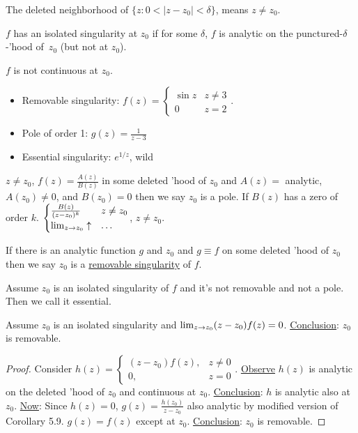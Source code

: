 \documentclass[]{article}
\begin{document}
\begin{definition}
	The deleted neighborhood of $\{z:0<|z-z_0|<\delta\}$, means $z\neq z_0$.
\end{definition}
\begin{definition}
	$f$ has an isolated singularity at $z_0$ if for some $\delta$, $f$ is analytic on the punctured-$\delta$-'hood of~$z_0$ (but not at $z_0$).
\end{definition}
\begin{observe}
	$f$ is not continuous at $z_0$.
\end{observe}
\begin{example}
	\begin{itemize}
		\item Removable singularity: $f(z) = \begin{cases} \sin{z} & z\neq 3 \\ 0 & z=2 \end{cases}$.
		\item Pole of order 1: $g(z) = \frac{1}{z-3}$
		\item Essential singularity: $e^{1/z}$, wild
	\end{itemize}
\end{example}
\begin{definition}
	$z\neq z_0$, $f(z) = \frac{A(z)}{B(z)}$ in some deleted 'hood of $z_0$ and $A(z) = $ analytic, $A(z_0) \neq 0$, and $B(z_0) = 0$ then we say $z_0$ is a pole. If $B(z)$ has a zero of order $k$. $\begin{cases} \frac{B(z)}{(z-z_0)^k} & z\neq z_0 \\ \lim_{z\rightarrow z_0} \uparrow & \dots \end{cases}$, $z\neq z_0$.
\end{definition}
\begin{definition}
	If there is an analytic function $g$ and $z_0$ and $g\equiv f$ on some deleted 'hood of $z_0$ then we say $z_0$ is a \underline{removable singularity} of $f$.
\end{definition}
\begin{definition}
	Assume $z_0$ is an isolated singularity of $f$ and it's not removable and not a pole. Then we call it essential.
\end{definition}
\begin{theorem}
	 Assume $z_0$ is an isolated singularity and $\lim_{z\rightarrow z_0} (z-z_0) f(z) = 0$. \underline{Conclusion}: $z_0$ is removable.
\end{theorem}
\begin{proof}
	Consider $h(z) = \begin{cases} (z-z_0)f(z), & z\neq 0 \\ 0, & z=0 \end{cases}$. \underline{Observe} $h(z)$ is analytic on the deleted 'hood of $z_0$ and continuous at $z_0$. \underline{Conclusion}: $h$ is analytic also at $z_0$. \underline{Now}: Since $h(z) = 0$, $g(z) = \frac{h(z_0)}{z-z_0}$ also analytic by modified version of Corollary 5.9. $g(z) = f(z)$ except at $z_0$. \underline{Conclusion}: $z_0$ is removable.
\end{proof}
\end{document}
